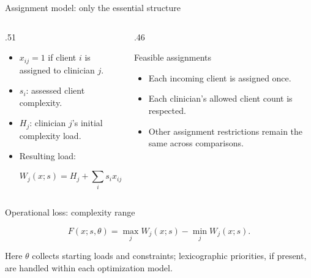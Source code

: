 \documentclass[aspectratio=169,11pt]{beamer}
\begin{document}
\begin{frame}{Assignment model: only the essential structure}

\begin{columns}[T,onlytextwidth]

\begin{column}{.51\textwidth}

\begin{itemize}
\setlength{\itemsep}{8pt}

\item $x_{ij}=1$ if client $i$ is assigned to clinician $j$.

\item $s_i$: assessed client complexity.

\item $H_j$: clinician $j$'s initial complexity load.

\item Resulting load:
\vspace{-7pt}

\[
W_j(x;s)=H_j+\sum_i s_i x_{ij}.
\]

\end{itemize}

\end{column}

\begin{column}{.46\textwidth}

\begin{block}{Feasible assignments}

\begin{itemize}
\setlength{\itemsep}{5pt}

\item Each incoming client is assigned once.

\item Each clinician's allowed client count is respected.

\item Other assignment restrictions remain the same across comparisons.

\end{itemize}

\end{block}

\end{column}

\end{columns}

\begin{block}{Operational loss: complexity range}

\[
F(x;s,\theta)=\max_j W_j(x;s)-\min_j W_j(x;s).
\]

\vspace{-6pt}

\small
Here $\theta$ collects starting loads and constraints; lexicographic priorities, if present, are handled within each optimization model.

\end{block}

\end{frame}
\end{document}
